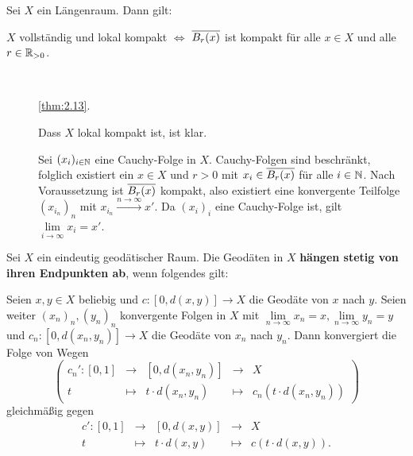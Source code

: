 \begin{korollar}
\label{kor:2.16}
	Sei $X$ ein Längenraum.
	Dann gilt:
	\begin{center}
		$X$ vollständig und lokal kompakt \quad $\Leftrightarrow$ \quad $\overline{B_r(x)}$ ist kompakt für alle $x \in X$ und alle $r \in \mathbb{R}_{>0}$.
	\end{center}
\end{korollar}
\newpage
\begin{beweis}
	\mbox{} \\[-.9cm]
	\begin{description}
		\item[\bewhin] \autoref{thm:2.13}.
		\item[\bewrueck] Dass $X$ lokal kompakt ist, ist klar.
		
		Sei $(x_i)_{i \in \mathbb{N}}$ eine Cauchy-Folge in $X$.
		Cauchy-Folgen sind beschränkt, folglich existiert ein $x \in X$ und $r > 0$ mit $x_i \in \overline{B_r(x)}$ für alle $i \in \mathbb{N}$.
		Nach Voraussetzung ist $\overline{B_r(x)}$ kompakt, also existiert eine konvergente Teilfolge $(x_{i_n})_n$ mit $x_{i_n} \xrightarrow{n \rightarrow \infty} x'$.
		Da $(x_i)_i$ eine Cauchy-Folge ist, gilt $\lim\limits_{i \rightarrow \infty} x_i = x'$. \qedhere
	\end{description}
\end{beweis}

\begin{definition}
\label{def:2.17}
	Sei $X$ ein eindeutig geodätischer Raum. 
	Die Geodäten in $X$ \textbf{hängen stetig von ihren Endpunkten ab}, wenn folgendes gilt:
	
	Seien $x,y \in X$ beliebig und $c\colon [0,d(x,y)] \rightarrow X$ die Geodäte von $x$ nach $y$.
	Seien weiter $(x_n)_n, (y_n)_n$ konvergente Folgen in $X$ mit $\lim\limits_{n \rightarrow \infty} x_n = x, \lim\limits_{n \rightarrow \infty} y_n = y$ und $c_n \colon [0,d(x_n,y_n)] \rightarrow X$ die Geodäte von $x_n$ nach $y_n$.
	Dann konvergiert die Folge von Wegen
	\[
		\left( \begin{array}{rcccl}
			c_n'\colon [0,1] & \longrightarrow & [0,d(x_n,y_n)] & \longrightarrow & X \\
			t & \longmapsto & t \cdot d(x_n,y_n) & \longmapsto & c_n(t \cdot d(x_n,y_n))
		\end{array} \right)
	\]
	gleichmäßig gegen
	\[
		\begin{array}{rcccl}
			c'\colon [0,1] & \longrightarrow & [0,d(x,y)] & \longrightarrow & X \\
			t & \longmapsto & t \cdot d(x,y) & \longmapsto & c(t \cdot d(x,y)).
		\end{array}
	\]	
\end{definition}

